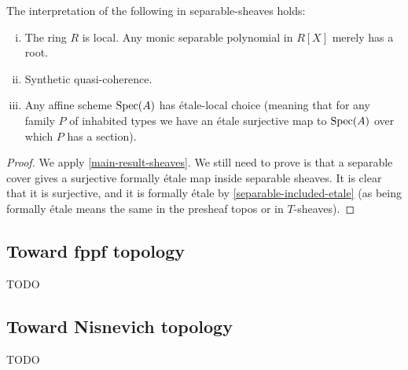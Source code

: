 \begin{theorem}
The interpretation of the following in separable-sheaves holds:
\begin{enumerate}[(i)]
\item The ring $R$ is local. Any monic separable polynomial in $R[X]$ merely has a root.
\item Synthetic quasi-coherence.
\item Any affine scheme $\operatorname{Spec}(A)$ has étale-local choice (meaning that for any family $P$ of inhabited types we have an étale surjective map to $\operatorname{Spec}(A)$ over which $P$ has a section).
\end{enumerate}
\end{theorem}

\begin{proof}
We apply \cref{main-result-sheaves}. We still need to prove is that a separable cover gives a surjective formally étale map inside separable sheaves. It is clear that it is surjective, and it is formally étale by \cref{separable-included-etale} (as being formally étale means the same in the presheaf topos or in $T$-sheaves).
\end{proof}

\subsection{Toward fppf topology}

TODO

\subsection{Toward Nisnevich topology}

TODO

